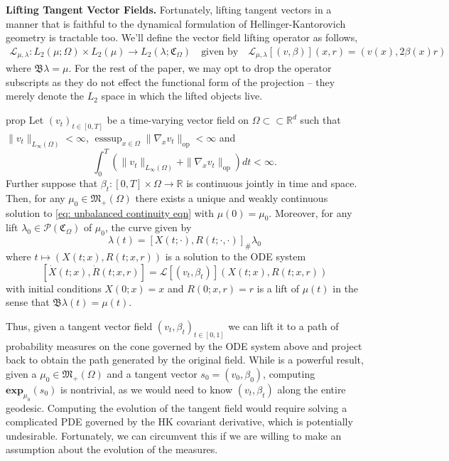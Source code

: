 \documentclass[11pt]{article}
\DeclareMathOperator{\esssup}{esssup}
\begin{document}
\noindent \textbf{Lifting Tangent Vector Fields.} Fortunately, lifting tangent vectors in a manner that is faithful to the dynamical formulation of Hellinger-Kantorovich geometry is tractable too. We'll define the vector field lifting operator as follows, 
\begin{align*}
    \mathcal{L}_{\mu, \lambda}: L_2(\mu; \Omega) \times L_2(\mu) \rightarrow L_2(\lambda; \mathfrak{C}_\Omega) \quad \text{given by} \quad \mathcal{L}_{\mu, \lambda}[(v, \beta)](x,r) = (v(x), 2\beta(x)r)
\end{align*}
where $\mathfrak{B}\lambda = \mu$. For the rest of the paper, we may opt to drop the operator subscripts as they do not effect the functional form of the projection -- they merely denote the $L_2$ space in which the lifted objects live. 
\begin{restatable}{prop}{} \label{lifting velocities}
    Let $(v_t)_{t \in [0, T]}$ be a time-varying vector field on $\Omega \subset \subset \mathbb{R}^d$ such that $\|v_t\|_{L_\infty(\Omega)} < \infty$, $\esssup_{x \in \Omega}\|\nabla_xv_t\|_{\text{op}} < \infty$ and 
    \[\int_0^T \left(\|v_t\|_{L_\infty(\Omega)} + \|\nabla_xv_t\|_{\text{op}}\right)dt < \infty.\]
    Further suppose that $\beta_t: [0, T] \times \Omega \rightarrow \mathbb{R}$ is continuous jointly in time and space. Then, for any $\mu_0 \in \mathfrak{M}_+(\Omega)$ there exists a unique and weakly continuous solution to \cref{eq: unbalanced continuity eqn} with $\mu(0) = \mu_0$. Moreover, for any lift $\lambda_0 \in \mathcal{P}(\mathfrak{C}_\Omega)$ of $\mu_0$, the curve given by 
    \[\lambda(t) = \left[X(t; \cdot), R(t; \cdot, \cdot)\right]_{\#} \lambda_0\]
    where $t \mapsto \left(X(t;x), R(t; x, r)\right)$ is a solution to the ODE system
    \[[\dot X(t; x), \dot R(t; x, r)] = \mathcal{L}[(v_t, \beta_t)]\left(X(t; x), R(t; x, r)\right)\]
    with initial conditions $X(0; x) = x$ and $R(0; x, r) = r$ is a lift of $\mu(t)$ in the sense that $\mathfrak{B}\lambda(t) = \mu(t)$. 
\end{restatable}
\noindent Thus, given a tangent vector field $(v_t, \beta_t)_{t \in [0, 1]}$ we can lift it to a path of probability measures on the cone governed by the ODE system above and project back to obtain the path generated by the original field. While  is a powerful result, given a $\mu_0 \in \mathfrak{M}_+(\Omega)$ and a tangent vector $s_0 = (v_0, \beta_0)$, computing $\mathbf{exp}_{\mu_0}(s_0)$ is nontrivial, as we would need to know $(v_t, \beta_t)$ along the entire geodesic. Computing the evolution of the tangent field would require solving a complicated PDE governed by the HK covariant derivative, which is potentially undesirable. Fortunately, we can circumvent this if we are willing to make an assumption about the evolution of the measures.  
\end{document}
